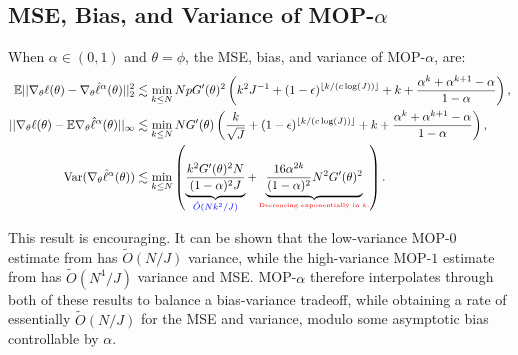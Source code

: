 \documentclass{article}
\begin{document}
\subsection{MSE, Bias, and Variance of MOP-$\alpha$}

\begin{thm}
    \label{thm:mop-biasvar}
    When $\alpha\in(0,1)$ and $\theta=\phi$, the MSE, bias, and variance of MOP-$\alpha$, are:
    \begin{align*}
        \mathbb{E}||\nabla_\theta\ell(\theta) - \nabla_\theta \hat\ell^\alpha(\theta)||_2^2 
        &\lesssim \min_{k \leq N} NpG'(\theta)^2\left(k^2J^{-1}+(1-\epsilon)^{\lfloor k/(c\log(J)) \rfloor}+k+\frac{\alpha^k  + \alpha^{k+1} - \alpha}{1-\alpha}\right),\\
        ||\nabla_\theta\ell(\theta) - \mathbb{E}\nabla_\theta \hat\ell^\alpha(\theta)||_\infty 
        &\lesssim \min_{k \leq N} NG'(\theta)\left(\frac{k}{\sqrt{J}}+(1-\epsilon)^{\lfloor k/(c\log(J)) \rfloor}+k+\frac{\alpha^k  + \alpha^{k+1} - \alpha}{1-\alpha}\right),\\
        \text{Var}(\nabla_\theta \hat\ell^\alpha(\theta)) &\lesssim \min_{k\leq N} \left(\underbrace{\frac{k^2G'(\theta)^2N}{(1-\alpha)^2J}}_{\textcolor{blue}{\tilde O(Nk^2/J)}} + \underbrace{\frac{16\alpha^{2k}}{(1-\alpha)^2}N^2G'(\theta)^2}_{\textcolor{red}{\text{\tiny{Decreasing exponentially in $k$.}}}} \right).
        \end{align*}
\end{thm}

This result is encouraging. It can be shown that the low-variance MOP-$0$ estimate from \cite{blei2018vsmc} has $\tilde{O}(N/J)$ variance, while the high-variance MOP-$1$ estimate from \cite{poyiadjis11} has $\tilde{O}(N^4/J)$ variance and MSE. MOP-$\alpha$ therefore interpolates through both of these results to balance a bias-variance tradeoff, while obtaining a rate of essentially $\tilde{O}(N/J)$ for the MSE and variance, modulo some asymptotic bias controllable by $\alpha$. 
\end{document}
